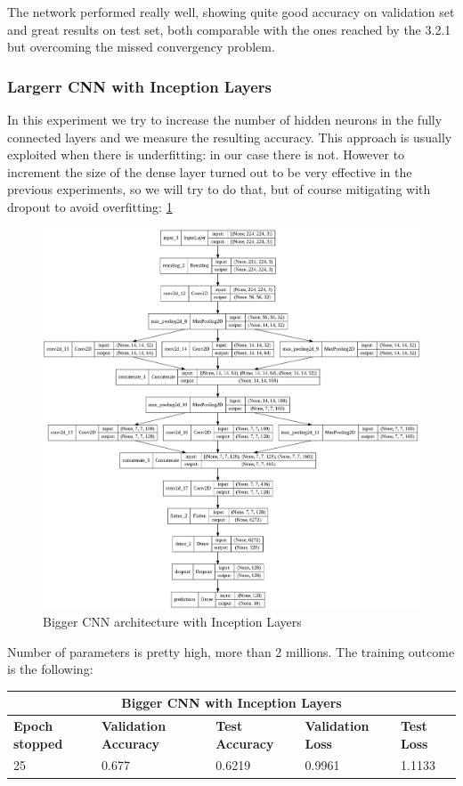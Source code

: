 \medskip

\noindent The network performed really well, showing quite good accuracy on validation set and great results on test set, both comparable with the ones reached by the 3.2.1 but overcoming the missed convergency problem. 


\subsubsection{Largerr CNN with Inception Layers}
In this experiment we try to increase the number of hidden neurons in the fully connected layers and we measure the resulting accuracy. This approach is usually exploited when there is underfitting: in our case there is not. However to increment the size of the dense layer turned out to be very effective in the previous experiments, so we will try to do that, but of course mitigating with dropout to avoid overfitting: \ref{fig: LargerInceptionLayersCNN}

\begin{figure}[H]
	\centering
	\includegraphics[height=0.6\textwidth]{img/scratch/larger_inception_layers.jpg}
	\caption{Bigger CNN architecture with Inception Layers}
	\label{fig: LargerInceptionLayersCNN}
\end{figure}

\noindent Number of parameters is pretty high, more than 2 millions. The training outcome is the following:

\medskip

\begin{tabular}{ |p{2cm}|p{2cm}|p{2cm}|p{2cm}|p{2cm}|  }
\hline
\multicolumn{5}{|c|}{Bigger CNN with Inception Layers} \\
\hline
\textbf{Epoch stopped} & \textbf{Validation Accuracy} & \textbf{Test Accuracy} & \textbf{Validation Loss} & \textbf{Test Loss} \\
\hline
25 & 0.677 & 0.6219 & 0.9961 & 1.1133\\
\hline
\end{tabular}

